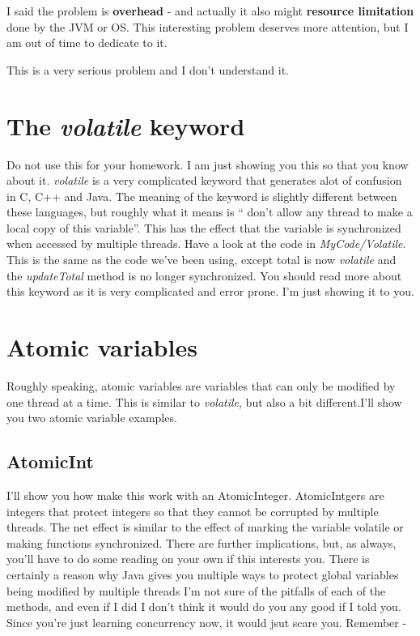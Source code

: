 \documentclass[12pt]{article}
\begin{document}
I said the problem is \textbf{overhead} - and actually it also might
\textbf{resource limitation} done by the JVM or OS. This interesting problem
deserves more attention, but I am out of time to dedicate to it.

This is a very serious problem and I don't understand it.

\section{The \textit{volatile} keyword}
Do not use this for your homework. I am just showing you this so that you know
about it. \textit{volatile} is a very complicated keyword that generates alot of
confusion in C, C++ and Java. The meaning of the keyword is slightly different
between these languages, but roughly what it means is `` don't allow any thread
to make a local copy of this variable''. This has the effect that the variable
is synchronized when accessed by multiple threads. Have a look at the code in 
\textit{MyCode/Volatile}. This is the same as the code we've been using, except
total is now \textit{volatile} and the \textit{updateTotal} method is no longer
synchronized. You should read more about this keyword as it is very complicated
and error prone. I'm just showing it to you.

\section{Atomic variables}
Roughly speaking, atomic variables are variables that can only be modified by
one thread at a time. This is similar to \textit{volatile}, but also a bit
different.I'll show you two atomic variable examples.
\subsection{ AtomicInt }
I'll show you how make this work with an AtomicInteger. AtomicIntgers are
integers that protect integers so that they cannot be corrupted by multiple
threads. The net effect is similar to the effect of marking the variable
volatile or making functions synchronized. There are further implications, but,
as always, you'll have to do some reading on your own if this interests you.
There is certainly a reason why Java gives you multiple ways to protect global
variables being modified by multiple threads I'm not sure of the pitfalls of
each of the methods, and even if I did I don't think it would do you any good if
I told you. Since you're just learning concurrency now, it would jsut scare you.
Remember -
\end{document}
